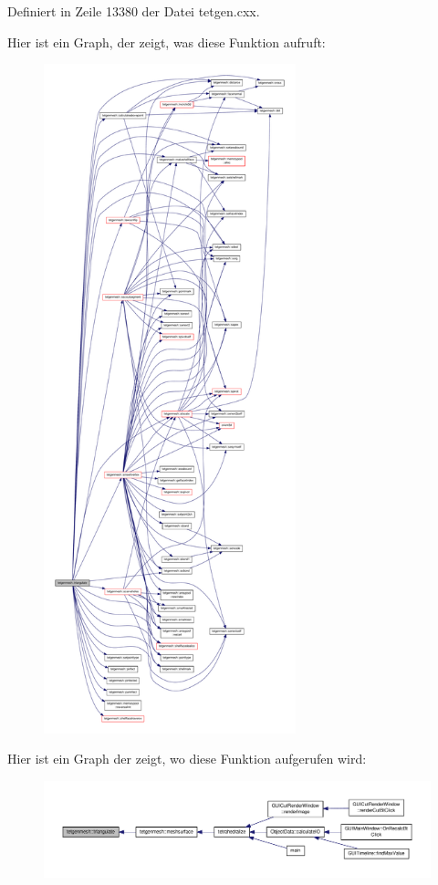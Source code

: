 Definiert in Zeile 13380 der Datei tetgen.\-cxx.



Hier ist ein Graph, der zeigt, was diese Funktion aufruft\-:
\nopagebreak
\begin{figure}[H]
\begin{center}
\leavevmode
\includegraphics[height=550pt]{classtetgenmesh_af62b4d5ed09b5a10704caf321e9c5b06_cgraph}
\end{center}
\end{figure}




Hier ist ein Graph der zeigt, wo diese Funktion aufgerufen wird\-:
\nopagebreak
\begin{figure}[H]
\begin{center}
\leavevmode
\includegraphics[width=350pt]{classtetgenmesh_af62b4d5ed09b5a10704caf321e9c5b06_icgraph}
\end{center}
\end{figure}



